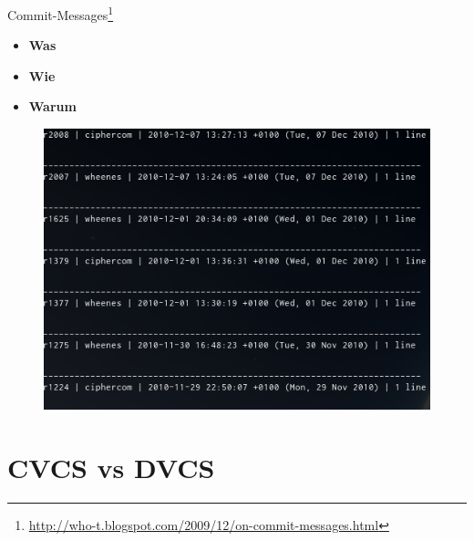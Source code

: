 \documentclass[presentation]{beamer}
\begin{document}
\begin{frame}{Commit-Messages\footnote{\url{http://who-t.blogspot.com/2009/12/on-commit-messages.html}}}
  \begin{itemize}[<+->]
  \item \textbf{Was}
  \item \textbf{Wie}
  \item \textbf{Warum}
  \end{itemize}
\end{frame}
\begin{frame}
  \begin{figure}
    \centering
    \includegraphics[width=\textwidth]{img/log}
  \end{figure}
\end{frame}
\section{CVCS vs DVCS}
\end{document}

